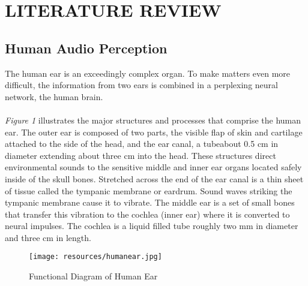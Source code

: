 \newpage
\section{LITERATURE REVIEW}

\subsection{Human Audio Perception}

The human ear is an exceedingly complex organ.  To make matters even more difficult, the information from two ears is combined in a perplexing neural network,
the human brain. \cite{smith2013}\\
\\
\textit{Figure 1} illustrates the major structures and processes that comprise the human ear. The outer ear is composed of two parts, the visible flap of skin and
cartilage attached to the side of the head, and the ear canal, a tubeabout 0.5 cm in diameter extending about three cm into the head. These structures direct environmental
sounds to the sensitive middle and inner ear organs located safely inside of the skull bones. Stretched across the end of the ear canal is a thin sheet of tissue called the
tympanic membrane or eardrum. Sound waves striking the tympanic membrane cause it to vibrate. The middle ear is a set of small bones that transfer this vibration to the cochlea
(inner ear) where it is converted to neural impulses. The cochlea is a liquid filled tube roughly two mm in diameter and three cm in length.
\begin{figure}[h]
        \centering
        \texttt{[image: resources/humanear.jpg]}
        \caption{Functional Diagram of Human Ear}
        \label{fig:figure1}
\end{figure}

